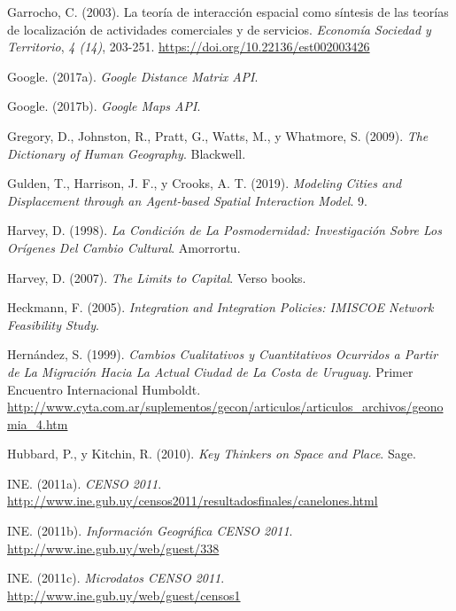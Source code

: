 \documentclass[12pt,spanish,]{article}
\begin{document}
\leavevmode\hypertarget{ref-garrocho2003}{}%
Garrocho, C. (2003). La teoría de interacción espacial como síntesis de
las teorías de localización de actividades comerciales y de servicios.
\emph{Economía Sociedad y Territorio}, \emph{4 (14)}, 203-251.
\url{https://doi.org/10.22136/est002003426}

\leavevmode\hypertarget{ref-google2017a}{}%
Google. (2017a). \emph{Google Distance Matrix API}.

\leavevmode\hypertarget{ref-google2017}{}%
Google. (2017b). \emph{Google Maps API}.

\leavevmode\hypertarget{ref-gregory2009}{}%
Gregory, D., Johnston, R., Pratt, G., Watts, M., y Whatmore, S. (2009).
\emph{The Dictionary of Human Geography}. Blackwell.

\leavevmode\hypertarget{ref-gulden2019}{}%
Gulden, T., Harrison, J. F., y Crooks, A. T. (2019). \emph{Modeling
Cities and Displacement through an Agent-based Spatial Interaction
Model}. 9.

\leavevmode\hypertarget{ref-harvey1998}{}%
Harvey, D. (1998). \emph{La Condición de La Posmodernidad: Investigación
Sobre Los Orígenes Del Cambio Cultural}. Amorrortu.

\leavevmode\hypertarget{ref-harvey2007}{}%
Harvey, D. (2007). \emph{The Limits to Capital}. Verso books.

\leavevmode\hypertarget{ref-heckmann2005}{}%
Heckmann, F. (2005). \emph{Integration and Integration Policies: IMISCOE
Network Feasibility Study}.

\leavevmode\hypertarget{ref-hernandez1999b}{}%
Hernández, S. (1999). \emph{Cambios Cualitativos y Cuantitativos
Ocurridos a Partir de La Migración Hacia La Actual Ciudad de La Costa de
Uruguay.} Primer Encuentro Internacional Humboldt.
\url{http://www.cyta.com.ar/suplementos/gecon/articulos/articulos_archivos/geonomia_4.htm}

\leavevmode\hypertarget{ref-hubbard2010}{}%
Hubbard, P., y Kitchin, R. (2010). \emph{Key Thinkers on Space and
Place}. Sage.

\leavevmode\hypertarget{ref-ine2011}{}%
INE. (2011a). \emph{CENSO 2011}.
\url{http://www.ine.gub.uy/censos2011/resultadosfinales/canelones.html}

\leavevmode\hypertarget{ref-ine2011c}{}%
INE. (2011b). \emph{Información Geográfica CENSO 2011}.
\url{http://www.ine.gub.uy/web/guest/338}

\leavevmode\hypertarget{ref-ine2011d}{}%
INE. (2011c). \emph{Microdatos CENSO 2011}.
\url{http://www.ine.gub.uy/web/guest/censos1}
\end{document}
